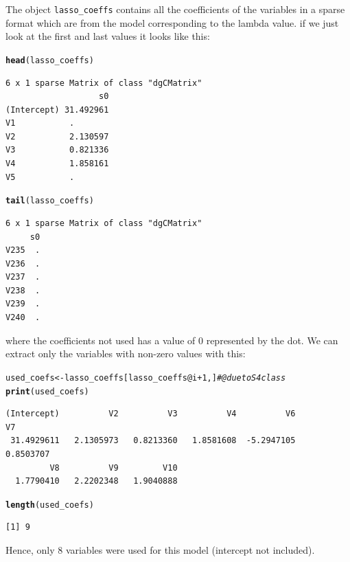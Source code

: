 \documentclass[11pt, a4paper, english]{article}\usepackage[]{graphicx}\usepackage[dvipsnames]{xcolor}
\makeatletter
\newcommand{\hlnum}[1]{\textcolor[rgb]{0.686,0.059,0.569}{#1}}%
\newcommand{\hlcom}[1]{\textcolor[rgb]{0.678,0.584,0.686}{\textit{#1}}}%
\newcommand{\hlopt}[1]{\textcolor[rgb]{0,0,0}{#1}}%
\newcommand{\hlstd}[1]{\textcolor[rgb]{0.345,0.345,0.345}{#1}}%
\newcommand{\hlkwb}[1]{\textcolor[rgb]{0.69,0.353,0.396}{#1}}%
\newcommand{\hlkwc}[1]{\textcolor[rgb]{0.333,0.667,0.333}{#1}}%
\newcommand{\hlkwd}[1]{\textcolor[rgb]{0.737,0.353,0.396}{\textbf{#1}}}%
\newenvironment{kframe}{%
 \def\at@end@of@kframe{}%
 \ifinner\ifhmode%
  \def\at@end@of@kframe{\end{minipage}}%
  \begin{minipage}{\columnwidth}%
 \fi\fi%
 \def\FrameCommand##1{\hskip\@totalleftmargin \hskip-\fboxsep
 \colorbox{shadecolor}{##1}\hskip-\fboxsep
     \hskip-\linewidth \hskip-\@totalleftmargin \hskip\columnwidth}%
 \MakeFramed {\advance\hsize-\width
   \@totalleftmargin\z@ \linewidth\hsize
   \@setminipage}}%
 {\par\unskip\endMakeFramed%
 \at@end@of@kframe}
\newenvironment{knitrout}{}{} %
\makeatother
\begin{document}
The object \texttt{lasso\_coeffs} contains all the coefficients of the variables in a sparse format which are from the model corresponding to the lambda value. if we just look at the first and last values it looks like this:
\begin{knitrout}
\color{fgcolor}\begin{kframe}
\begin{alltt}
\hlkwd{head}\hlstd{(lasso_coeffs)}
\end{alltt}
\begin{verbatim}
6 x 1 sparse Matrix of class "dgCMatrix"
                   s0
(Intercept) 31.492961
V1           .       
V2           2.130597
V3           0.821336
V4           1.858161
V5           .       
\end{verbatim}
\begin{alltt}
\hlkwd{tail}\hlstd{(lasso_coeffs)}
\end{alltt}
\begin{verbatim}
6 x 1 sparse Matrix of class "dgCMatrix"
     s0
V235  .
V236  .
V237  .
V238  .
V239  .
V240  .
\end{verbatim}
\end{kframe}
\end{knitrout}
where the coefficients not used has a value of 0 represented by the dot. We can extract only the variables with non-zero values with this:
\begin{knitrout}
\color{fgcolor}\begin{kframe}
\begin{alltt}
\hlstd{used_coefs} \hlkwb{<-} \hlstd{lasso_coeffs[lasso_coeffs}\hlopt{@}\hlkwc{i}\hlopt{+}\hlnum{1}\hlstd{,]} \hlcom{#@ due to S4 class}
\hlkwd{print}\hlstd{(used_coefs)}
\end{alltt}
\begin{verbatim}
(Intercept)          V2          V3          V4          V6          V7 
 31.4929611   2.1305973   0.8213360   1.8581608  -5.2947105   0.8503707 
         V8          V9         V10 
  1.7790410   2.2202348   1.9040888 
\end{verbatim}
\begin{alltt}
\hlkwd{length}\hlstd{(used_coefs)}
\end{alltt}
\begin{verbatim}
[1] 9
\end{verbatim}
\end{kframe}
\end{knitrout}
Hence, only 8 variables were used for this model (intercept not included).
\end{document}
